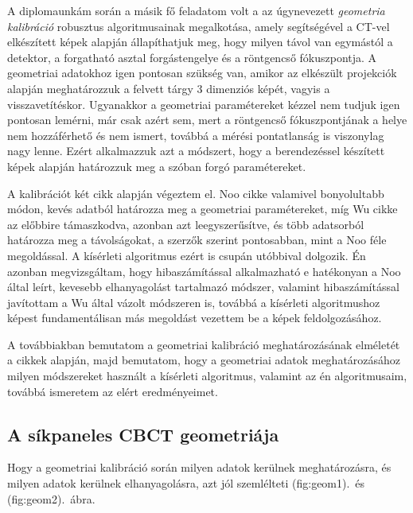 \documentclass[a4paper,12pt]{article}
\begin{document}
A diplomaunkám során a másik fő feladatom volt a  az úgynevezett \emph{geometria kalibráció} robusztus algoritmusainak megalkotása, amely segítségével a CT-vel elkészített képek alapján állapíthatjuk meg, hogy milyen távol van egymástól a detektor, a forgatható asztal forgástengelye és a röntgencső fókuszpontja. A geometriai adatokhoz igen pontosan szükség van, amikor az elkészült projekciók alapján meghatározzuk a felvett tárgy 3 dimenziós képét, vagyis a visszavetítéskor. Ugyanakkor a geometriai paramétereket kézzel nem tudjuk igen pontosan lemérni, már csak azért sem, mert a röntgencső fókuszpontjának a helye nem hozzáférhető és nem ismert, továbbá a mérési pontatlanság is viszonylag nagy lenne. Ezért alkalmazzuk azt a módszert, hogy a berendezéssel készített képek alapján határozzuk meg a szóban forgó paramétereket. 

A kalibrációt két cikk alapján végeztem el. Noo cikke\cite{noo} valamivel bonyolultabb  módon, kevés adatból határozza meg a geometriai paramétereket, míg Wu\cite{wu} cikke az előbbire támaszkodva, azonban azt leegyszerűsítve,  és több adatsorból határozza meg a távolságokat, a szerzők szerint pontosabban, mint a Noo féle megoldással. A kísérleti algoritmus ezért is csupán utóbbival dolgozik. Én azonban megvizsgáltam, hogy hibaszámítással alkalmazható e hatékonyan a Noo által leírt, kevesebb elhanyagolást tartalmazó módszer, valamint hibaszámítással javítottam a Wu által vázolt módszeren is, továbbá a kísérleti algoritmushoz képest fundamentálisan más megoldást vezettem be a képek feldolgozásához.

 A továbbiakban bemutatom a geometriai kalibráció meghatározásának elméletét a cikkek alapján, majd bemutatom, hogy a geometriai adatok meghatározásához milyen módszereket használt a kísérleti algoritmus, valamint az én algoritmusaim, továbbá ismeretem az elért eredményeimet. 

\subsection{A síkpaneles CBCT geometriája}

Hogy a geometriai kalibráció során milyen adatok kerülnek meghatározásra, és milyen adatok kerülnek elhanyagolásra, azt jól szemlélteti \aref({fig:geom1}).\ és \aref({fig:geom2}).~ábra. 
\end{document}
